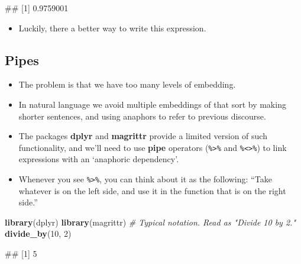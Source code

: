 \documentclass[
]{book}
\newenvironment{Shaded}{\begin{snugshade}}{\end{snugshade}}
\newcommand{\CommentTok}[1]{\textcolor[rgb]{0.56,0.35,0.01}{\textit{#1}}}
\newcommand{\DecValTok}[1]{\textcolor[rgb]{0.00,0.00,0.81}{#1}}
\newcommand{\FunctionTok}[1]{\textcolor[rgb]{0.13,0.29,0.53}{\textbf{#1}}}
\newcommand{\NormalTok}[1]{#1}
\providecommand{\tightlist}{%
  \setlength{\itemsep}{0pt}\setlength{\parskip}{0pt}}
\begin{document}
\begin{Shaded}
\begin{Highlighting}[]
\NormalTok{\#\# [1] 0.9759001}
\end{Highlighting}
\end{Shaded}

\begin{itemize}
\tightlist
\item
  Luckily, there a better way to write this expression.
\end{itemize}

\hypertarget{pipes-1}{%
\subsection{Pipes}\label{pipes-1}}

\begin{itemize}
\tightlist
\item
  The problem is that we have too many levels of embedding.
\item
  In natural language we avoid multiple embeddings of that sort by making shorter sentences, and using anaphors to refer to previous discourse.
\item
  The packages \textbf{dplyr} and \textbf{magrittr} provide a limited version of such functionality, and we'll need to use \textbf{pipe} operators (\texttt{\%\textgreater{}\%} and \texttt{\%\textless{}\textgreater{}\%}) to link expressions with an `anaphoric dependency'.
\item
  Whenever you see \texttt{\%\textgreater{}\%}, you can think about it as the following: ``Take whatever is on the left side, and use it in the function that is on the right side.''
\end{itemize}

\begin{Shaded}
\begin{Highlighting}[]
\FunctionTok{library}\NormalTok{(dplyr)}
\FunctionTok{library}\NormalTok{(magrittr)}
\CommentTok{\# Typical notation. Read as "Divide 10 by 2."}
\FunctionTok{divide\_by}\NormalTok{(}\DecValTok{10}\NormalTok{, }\DecValTok{2}\NormalTok{)}
\end{Highlighting}
\end{Shaded}

\begin{Shaded}
\begin{Highlighting}[]
\NormalTok{\#\# [1] 5}
\end{Highlighting}
\end{Shaded}
\end{document}
